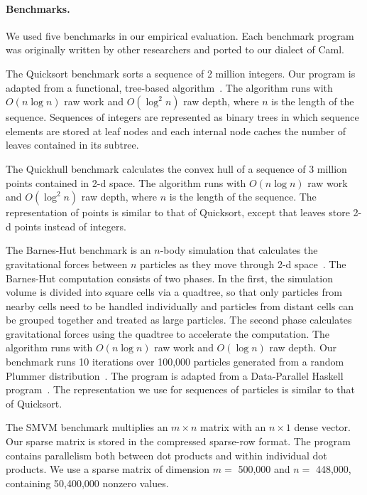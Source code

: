 \paragraph{Benchmarks.}

We used five benchmarks in our empirical evaluation. Each benchmark
program was originally written by other researchers and ported to our
dialect of Caml. 

The Quicksort benchmark sorts a sequence of 2 million integers. Our
program is adapted from a functional, tree-based
algorithm~\cite{BlellochGr95}. The algorithm runs with $O(n
\log n)$ raw work and $O(\log^2 n)$ raw depth, where $n$ is the length
of the sequence. Sequences of integers are represented as binary trees
in which sequence elements are stored at leaf nodes and each internal
node caches the number of leaves contained in its subtree.

The Quickhull benchmark calculates the convex hull of a sequence of
3 million points contained in 2-d space. The algorithm runs with $O(n
\log n)$ raw work and $O(\log^2 n)$ raw depth, where $n$ is the length
of the sequence. The representation of points is similar to that of
Quicksort, except that leaves store 2-d points instead of integers.

The Barnes-Hut benchmark is an $n$-body simulation that calculates the
gravitational forces between $n$ particles as they move through 2-d
space~\cite{barnes-hut}. The Barnes-Hut computation consists of two
phases. In the first, the simulation volume is divided into square
cells via a quadtree, so that only particles from nearby cells need to
be handled individually and particles from distant cells can be
grouped together and treated as large particles. The second phase
calculates gravitational forces using the quadtree to accelerate the
computation. The algorithm runs with $O(n \log n)$ raw work and
$O(\log n)$ raw depth. Our benchmark runs 10 iterations over 100,000
particles generated from a random Plummer
distribution~\cite{plummer-distribution}. The program is adapted from
a Data-Parallel Haskell
program~\cite{PeytonJonesHarnessingMulticores}. The representation we
use for sequences of particles is similar to that of Quicksort.

The SMVM benchmark multiplies an $m \times n$ matrix with an $n \times
1$ dense vector. Our sparse matrix is stored in the compressed
sparse-row format. The program contains parallelism both between dot
products and within individual dot products. We use a sparse matrix
of dimension $m =$ 500,000 and $n =$ 448,000, containing 50,400,000
nonzero values.

